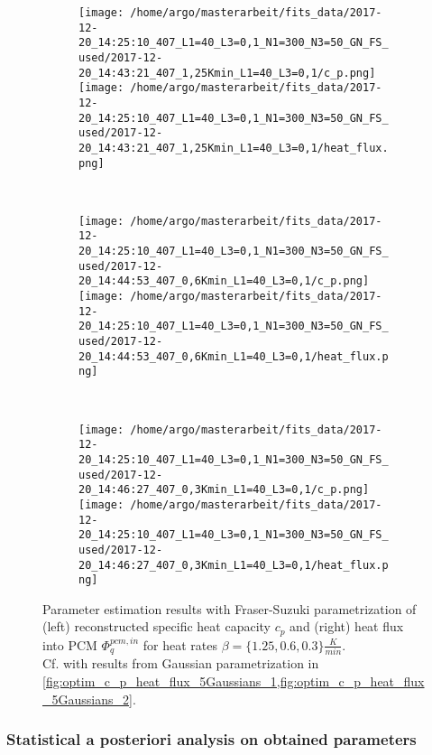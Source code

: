 \documentclass{scrartcl}[12pt, halfparskip]
\numberwithin{equation}{section}
\numberwithin{figure}{section}
\numberwithin{table}{section}
\begin{document}
\begin{figure}[H]
	\begin{subfigure}{1.\textwidth}
		\texttt{[image: /home/argo/masterarbeit/fits\_data/2017-12-20\_14:25:10\_407\_L1=40\_L3=0,1\_N1=300\_N3=50\_GN\_FS\_used/2017-12-20\_14:43:21\_407\_1,25Kmin\_L1=40\_L3=0,1/c\_p.png]}
		\texttt{[image: /home/argo/masterarbeit/fits\_data/2017-12-20\_14:25:10\_407\_L1=40\_L3=0,1\_N1=300\_N3=50\_GN\_FS\_used/2017-12-20\_14:43:21\_407\_1,25Kmin\_L1=40\_L3=0,1/heat\_flux.png]}
	\end{subfigure} \\[1ex]
	
	\begin{subfigure}{1.\textwidth}
		\texttt{[image: /home/argo/masterarbeit/fits\_data/2017-12-20\_14:25:10\_407\_L1=40\_L3=0,1\_N1=300\_N3=50\_GN\_FS\_used/2017-12-20\_14:44:53\_407\_0,6Kmin\_L1=40\_L3=0,1/c\_p.png]}
		\texttt{[image: /home/argo/masterarbeit/fits\_data/2017-12-20\_14:25:10\_407\_L1=40\_L3=0,1\_N1=300\_N3=50\_GN\_FS\_used/2017-12-20\_14:44:53\_407\_0,6Kmin\_L1=40\_L3=0,1/heat\_flux.png]}
	\end{subfigure} \\[1ex]
	
	\begin{subfigure}{1.\textwidth}
		\texttt{[image: /home/argo/masterarbeit/fits\_data/2017-12-20\_14:25:10\_407\_L1=40\_L3=0,1\_N1=300\_N3=50\_GN\_FS\_used/2017-12-20\_14:46:27\_407\_0,3Kmin\_L1=40\_L3=0,1/c\_p.png]}
		\texttt{[image: /home/argo/masterarbeit/fits\_data/2017-12-20\_14:25:10\_407\_L1=40\_L3=0,1\_N1=300\_N3=50\_GN\_FS\_used/2017-12-20\_14:46:27\_407\_0,3Kmin\_L1=40\_L3=0,1/heat\_flux.png]}
	\end{subfigure}
	\caption{Parameter estimation results with Fraser-Suzuki parametrization of (left) reconstructed specific heat capacity $c_p$ and (right) heat flux into PCM $\varPhi_q^{pcm,in}$ for heat rates $\beta=\{ 1.25, 0.6, 0.3 \} \frac{K}{min}$. \\
	Cf. with results from Gaussian parametrization in \cref{fig:optim_c_p_heat_flux_5Gaussians_1,fig:optim_c_p_heat_flux_5Gaussians_2}.}
	\label{fig:optim_c_p_heat_flux_FS_2}
\end{figure}

\subsubsection{Statistical a posteriori analysis on obtained parameters}
\end{document}
